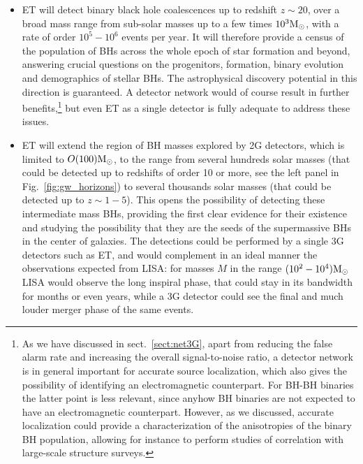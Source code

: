 \begin{itemize}

\item ET will detect binary black hole coalescences up to redshift $z\sim 20$, over a broad mass range from sub-solar masses up to a few times $10^3 \mathrm{M}_{\odot}$, with a rate of order $10^5-10^6$ events per year. It  will therefore provide a census of the population of BHs across the whole epoch of star formation and beyond, answering crucial questions on the progenitors, formation, binary evolution and demographics of stellar BHs. The astrophysical discovery potential in this direction is guaranteed. A detector network would of course result in further benefits,\footnote{As we have discussed in sect.~\ref{sect:net3G}, apart from reducing the false alarm rate and increasing the overall signal-to-noise ratio, a detector network is in general important  for accurate source localization, which also gives  the possibility of identifying an electromagnetic counterpart. For BH-BH binaries the latter point is less relevant, since anyhow BH binaries are not expected to have an electromagnetic counterpart. However,  as we discussed, accurate localization could  provide  a characterization of the anisotropies of the binary BH population, allowing  for instance  to perform studies of correlation with large-scale structure surveys.}  but even  ET as a single detector is fully adequate to address these issues. 

\vspace{1mm}

\item ET will extend  the region of BH masses  explored by 2G detectors, which is limited to  $O(100) \mathrm{M}_{\odot}$, to the range from several hundreds solar masses (that could be detected up to redshifts of order 10 or more, see the left panel in Fig.~\ref{fig:gw_horizons}) to several thousands solar masses (that could be detected up to $z\sim 1-5$).  This 
opens the possibility of detecting  these intermediate mass BHs, providing the first clear evidence for their existence and  studying the possibility that they are the seeds of the supermassive BHs in the center of galaxies. The detections  could be performed by a single 3G detectors such as ET, and would  complement in an ideal manner the observations expected from  LISA: for masses $M$ in the range $(10^2-10^4) \mathrm{M}_{\odot}$ LISA would observe the long inspiral phase, that could stay in its bandwidth for months
or even years, while a 3G detector could see the final and much louder merger phase of the same events.


\end{itemize}
